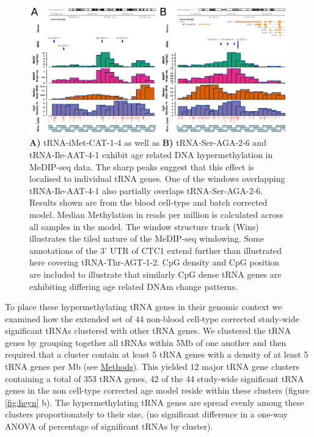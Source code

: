 \documentclass[
]{book}
\begin{document}
\begin{figure}

{\centering \includegraphics[width=1\linewidth]{figs/gviz_iMet-CAT-1-4_Ser-AGA-2-6_3k_white_bigger} 

}

\caption{\textbf{A)} tRNA-iMet-CAT-1-4 as well as \textbf{B)} tRNA-Ser-AGA-2-6 and tRNA-Ile-AAT-4-1 exhibit age related DNA hypermethylation in MeDIP-seq data. The sharp peaks suggest that this effect is localised to individual tRNA genes. One of the windows overlapping tRNA-Ile-AAT-4-1 also partially overlaps tRNA-Ser-AGA-2-6.
Results shown are from the blood cell-type and batch corrected model. Median Methylation in reads per million is calculated across all samples in the model. The window structure track (Wins) illustrates the tiled nature of the MeDIP-seq windowing. Some annotations of the 3' UTR of CTC1 extend further than illustrated here covering tRNA-Thr-AGT-1-2. CpG density and CpG position are included to illustrate that similarly CpG dense tRNA genes are exhibiting differing age related DNAm change patterns.}\label{fig:gvizLocusZooms}
\end{figure}




To place these hypermethylating tRNA genes in their genomic context we examined how the extended set of 44 non-blood cell-type corrected study-wide significant tRNAs clustered with other tRNA genes.
We clustered the tRNA genes by grouping together all tRNAs within 5Mb of one another and then required that a cluster contain at least 5 tRNA genes with a density of at least 5 tRNA genes per Mb (see \protect\hyperlink{clustering}{Methods}).
This yielded 12 major tRNA gene clusters containing a total of 353 tRNA genes, 42 of the 44 study-wide significant tRNA genes in the non cell-type corrected age model reside within these clusters (figure \ref{fig:heyn} b).
The hypermethylating tRNA genes are spread evenly among these clusters proportionately to their size, (no significant difference in a one-way ANOVA of percentage of significant tRNAs by cluster).
\end{document}

